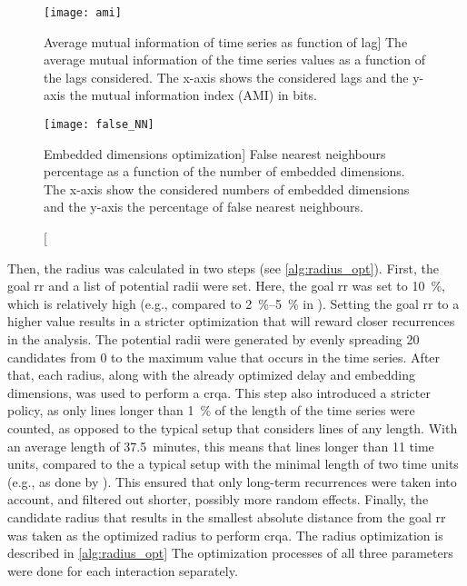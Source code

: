 \begin{figure}[H]
	\centering
	\begin{minipage}{.45\linewidth}
		\centering
		\texttt{[image: ami]}
		\caption
		[Average mutual information of time series as function of lag]
		{The average mutual information of the time series values as a function of the lags considered.
			The x-axis shows the considered lags and the y-axis the mutual information index (AMI) in bits.}
		\label{fig:ami}
	\end{minipage}%
	\hfill
	\begin{minipage}{.45\linewidth}
		\centering
		\texttt{[image: false\_NN]}
		\caption
		[Embedded dimensions optimization]
		{False nearest neighbours percentage as a function of the number of embedded dimensions.
			The x-axis show the considered numbers of embedded dimensions and the y-axis the percentage of false nearest neighbours.}
		\label{fig:false_nn}
	\end{minipage}	
\end{figure}

Then, the radius was calculated in two steps (see \cref{alg:radius_opt}).
First, the goal \ac{rr} and a list of potential radii were set.
Here, the goal \ac{rr} was set to \SI{10}{\percent}, which is relatively high (e.g., compared to \SIrange{2}{5}{\percent} in \citet{Coco2014crqa-r}).
Setting the goal \ac{rr} to a higher value results in a stricter optimization that will reward closer recurrences in the analysis.
The potential radii were generated by evenly spreading 20 candidates from 0 to the maximum value that occurs in the time series.
After that, each radius, along with the already optimized delay and embedding dimensions, was used to perform a \ac{crqa}.
This step also introduced a stricter policy, as only lines longer than \SI{1}{\percent} of the length of the time series were counted, as opposed to the typical setup that considers lines of any length.
With an average length of \SI{37.5}{minutes}, this means that lines longer than 11 time units, compared to the a typical setup with the minimal length of two time units (e.g., as done by \citet{Borrie2019syncing}).
This ensured that only long-term recurrences were taken into account, and filtered out shorter, possibly more random effects.
Finally, the candidate radius that results in the smallest absolute distance from the goal \ac{rr} was taken as the optimized radius to perform \ac{crqa}.
The radius optimization is described in \cref{alg:radius_opt}
The optimization processes of all three parameters were done for each interaction separately.

